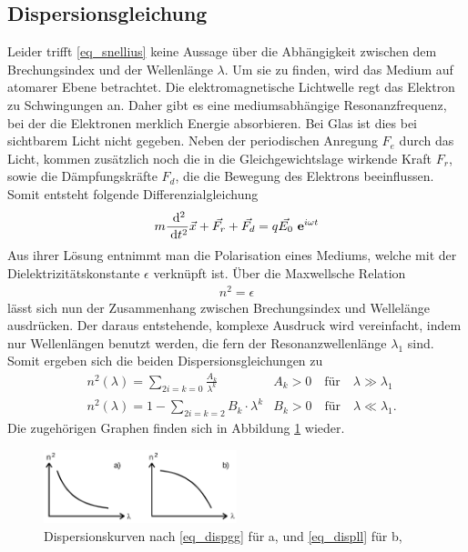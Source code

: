 \subsection{Dispersionsgleichung}
Leider trifft \eqref{eq_snellius} keine Aussage über die Abhängigkeit zwischen dem Brechungsindex und der Wellenlänge $\lambda$. Um sie
zu finden, wird das Medium auf atomarer Ebene betrachtet. Die elektromagnetische Lichtwelle regt das Elektron zu Schwingungen an. Daher gibt
es eine mediumsabhängige Resonanzfrequenz, bei der die Elektronen merklich Energie absorbieren. Bei Glas ist dies bei sichtbarem Licht nicht
gegeben. Neben der periodischen Anregung $F_e$ durch das Licht, kommen zusätzlich noch die in die Gleichgewichtslage wirkende Kraft $F_r$, sowie
die Dämpfungskräfte $F_d$, die die Bewegung des Elektrons beeinflussen. Somit entsteht folgende Differenzialgleichung
\begin{align}
 m \frac{\; \mathrm{d}^2}{\; \mathrm{d} t^2}\vec{x} + \vec{F_r} + \vec{F_d} = q \vec{E_0} \ \mathbf{e}^{i\omega t}
 \label{eq_dgl}
\end{align}
Aus ihrer Lösung entnimmt man die Polarisation eines Mediums, welche mit der Dielektrizitätskonstante $\epsilon$ verknüpft ist. Über die
Maxwellsche Relation
\begin{align}
 \nonumber
 n^2 = \epsilon
\end{align}
lässt sich nun der Zusammenhang zwischen Brechungsindex und Wellelänge ausdrücken. Der daraus entstehende, komplexe Ausdruck wird vereinfacht,
indem nur Wellenlängen benutzt werden, die fern der Resonanzwellenlänge $\lambda_1$ sind. Somit ergeben sich die beiden Dispersionsgleichungen zu
\begin{align}
 &n^2(\lambda) = \sum_{2i=k=0} \frac{A_k}{\lambda ^k} &A_k > 0 \quad \text{für} \quad \lambda \gg \lambda_1 \label{eq_dispgg}\\
 &n^2(\lambda) = 1 - \sum_{2i=k=2} B_k \cdot \lambda^k  &B_k > 0 \quad \text{für} \quad \lambda \ll \lambda_1. \label{eq_displl}
\end{align}
Die zugehörigen Graphen finden sich in Abbildung \ref{pic_dispersion} wieder.
\begin{figure}[H]
 \includegraphics[width= 0.5\textwidth]{pics/dispersion.png}
 \caption{Dispersionskurven nach \eqref{eq_dispgg} für a, und \eqref{eq_displl} für b,}
 \label{pic_dispersion}
\end{figure}

